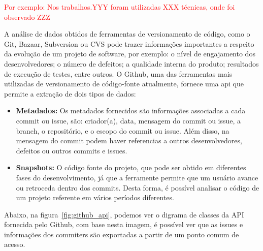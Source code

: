 


\textcolor{red}{Por exemplo: Nos trabalhos.YYY foram utilizadas XXX técnicas, onde foi observado ZZZ}


A análise de dados obtidos de ferramentas de versionamento de código, como o Git, Bazaar, Subversion ou CVS pode trazer informações importantes a respeito da evolução de um projeto de software, por exemplo: o nível de engajamento dos desenvolvedores; o número de defeitos; a qualidade interna do produto; resultados de execução de testes, entre outros\cite{artAndScience}. O Github, uma das ferramentas mais utilizadas de versionamento de código-fonte atualmente, fornece uma api que permite a extração de dois tipos de dados: 


\begin{itemize}
\item \textbf{Metadados:} Os metadados fornecidos são informações associadas a cada commit ou issue, são: criador(a), data, mensagem do commit ou issue, a branch, o repositório, e o escopo do commit ou issue. Além disso, na mensagem do commit podem haver referencias a outros
desenvolvedores, defeitos ou outros commits e issues.
\item \textbf{Snapshots:} O código fonte do projeto, que pode ser obtido em diferentes fases do desenvolvimento, já que a ferramente permite que um usuário avance ou retroceda dentro dos commits. Desta forma, é possível analisar o código de um projeto referente em vários períodos diferentes.
\end{itemize}

Abaixo, na figura~\ref{fig:github_api}, podemos ver o digrama de classes da API fornecida pelo
Github, com base nesta imagem, é possível ver que as issues e informações dos commiters
são exportadas a partir de um ponto comum de acesso.


